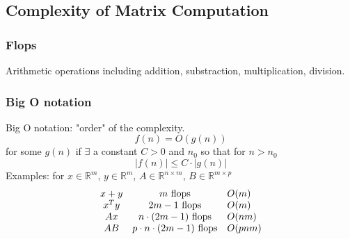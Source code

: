 \begin{multicols}{2}
\subsection{Complexity of Matrix Computation}
\subsubsection{Flops}
Arithmetic operations including addition, substraction, multiplication, division.

\subsubsection{Big O notation}
Big O notation: "order" of the complexity.
\[
    f(n)=O(g(n))
\] 
for some $g(n)$ if $\exists$ a constant $C>0$ and $n_0$ so that for $n>n_0$
\[
    |f(n)|\leq C\cdot|g(n)|
\]
Examples: for $x\in\mathbb{R}^m$, $y\in\mathbb{R}^m$, $A\in\mathbb{R}^{n\times m}$, $B\in\mathbb{R}^{m \times p}$
\[
    \begin{array}{ccl}
        x+y & m \text{ \rm flops} & O(m) \\
        x^Ty& 2m-1 \text{ \rm flops}  & O(m) \\
        Ax  & n\cdot(2m-1) \text{ \rm flops} & O(nm) \\ 
        AB  & p\cdot n \cdot (2m-1)\text{ \rm flops} & O(pnm) \\ 
    \end{array}
\]
\newpage    
\end{multicols}

